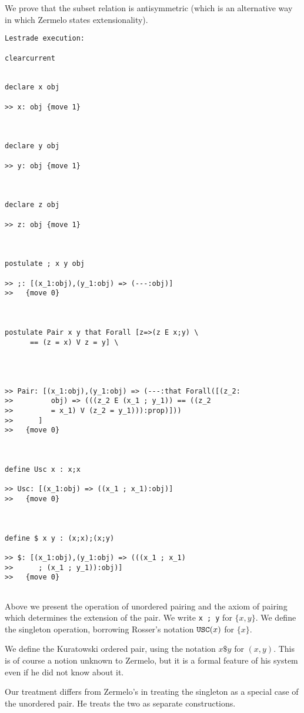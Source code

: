 \documentclass[12pt]{article}
\begin{document}
We prove that the subset relation is antisymmetric (which is an alternative way in which Zermelo states extensionality).

\begin{verbatim}Lestrade execution:

clearcurrent


declare x obj

>> x: obj {move 1}



declare y obj

>> y: obj {move 1}



declare z obj

>> z: obj {move 1}



postulate ; x y obj

>> ;: [(x_1:obj),(y_1:obj) => (---:obj)]
>>   {move 0}



postulate Pair x y that Forall [z=>(z E x;y) \
      == (z = x) V z = y] \
   



>> Pair: [(x_1:obj),(y_1:obj) => (---:that Forall([(z_2:
>>         obj) => (((z_2 E (x_1 ; y_1)) == ((z_2
>>         = x_1) V (z_2 = y_1))):prop)]))
>>      ]
>>   {move 0}



define Usc x : x;x

>> Usc: [(x_1:obj) => ((x_1 ; x_1):obj)]
>>   {move 0}



define $ x y : (x;x);(x;y)

>> $: [(x_1:obj),(y_1:obj) => (((x_1 ; x_1)
>>      ; (x_1 ; y_1)):obj)]
>>   {move 0}


\end{verbatim}

Above we present the operation of unordered pairing and the axiom of pairing which determines the extension of the pair.  We write {\tt x ; y} for $\{x,y\}$.  We define
 the singleton operation, borrowing Rosser's notation ${\tt USC}(x)$ for $\{x\}$.

We define the Kuratowski ordered pair, using the notation $x \$ y$ for $(x,y)$.  This is of course a notion unknown to Zermelo, but it is a formal feature of his system even if he did not know about it.

Our treatment differs from Zermelo's in treating the singleton as a special case of the unordered pair.  He treats the two as separate constructions.
\end{document}
